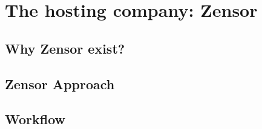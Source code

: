 \chapter{The hosting company: Zensor}

\section{Why Zensor exist?}


\section{Zensor Approach}


\section{Workflow}

